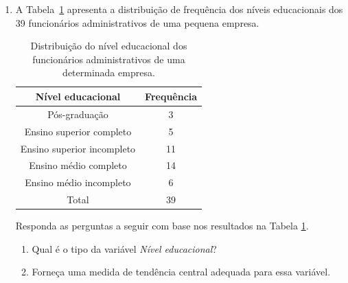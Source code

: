 \documentclass{article}
\begin{document}
\begin{enumerate}
	Com base nos dados da Tabela~\ref{t:narcolepsia}, ache a moda, média e mediana do número de cochilos registrados na amostra.
	
	\item A Tabela~\ref{t:nivel_educacao} apresenta a distribuição de frequência dos níveis educacionais dos 39 funcionários administrativos de uma pequena empresa.
	\begin{table}[htp]
	\centering
	\caption{Distribuição do nível educacional dos funcionários administrativos de uma determinada empresa. }
	\label{t:nivel_educacao}
	\begin{tabular}{c|c}
	\hline
	Nível educacional & Frequência \\
	\hline
Pós-graduação & 3 \\
Ensino superior completo & 5\\
Ensino superior incompleto & 11\\
Ensino médio completo & 14\\
Ensino médio incompleto & 6\\
\hline
Total & 39 \\
	\hline
	\end{tabular}
	\end{table}
	
	Responda as perguntas a seguir com base nos resultados na Tabela \ref{t:nivel_educacao}.
\begin{enumerate}
	\item Qual é o tipo da variável \textit{Nível educacional}?
	\item Forneça uma medida de tendência central adequada para essa variável.	
\end{enumerate}			

	
		
	
\end{enumerate}
\end{document}
